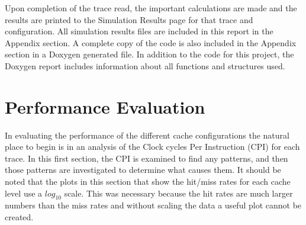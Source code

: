 \documentclass[11pt,titlepage]{article}
\begin{document}
Upon completion of the trace read, the important calculations are made and the results are printed to the Simulation Results page for that trace and configuration. All simulation results files are included in this report in the Appendix section. A complete copy of the code is also included in the Appendix section in a Doxygen generated file. In addition to the code for this project, the Doxygen report includes information about all functions and structures used.

\section{Performance Evaluation}
In evaluating the performance of the different cache configurations the natural place to begin is in an analysis of the Clock cycles Per Instruction (CPI) for each trace.  In this first section, the CPI is examined to find any patterns, and then those patterns are investigated to determine what causes them. It should be noted that the plots in this section that show the hit/miss rates for each cache level use a $log_{10}$ scale. This was necessary because the hit rates are much larger numbers than the miss rates and without scaling the data a useful plot cannot be created.
\end{document}
